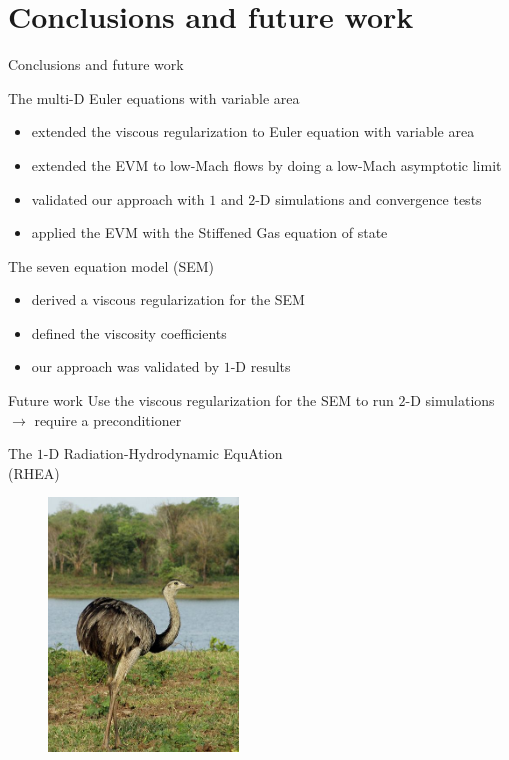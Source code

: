\documentclass[xcolor=dvipsnames,10pt]{beamer}
\begin{document}
\section{Conclusions and future work}
\begin{frame}{Conclusions and future work}
\begin{block}{The multi-D Euler equations with variable area}
\begin{itemize}
\item extended the viscous regularization to Euler equation with variable area
\item extended the EVM to low-Mach flows by doing a low-Mach asymptotic limit
\item validated our approach with $1$ and $2$-D simulations and convergence tests
\item applied the EVM with the Stiffened Gas equation of state
\end{itemize}
\end{block}
\begin{block}{The seven equation model (SEM)}
\begin{itemize}
\item derived a viscous regularization for the SEM
\item defined the viscosity coefficients
\item our approach was validated by $1$-D results
\end{itemize}
\end{block}
\begin{block}{Future work}
Use the viscous regularization for the SEM to run $2$-D simulations $\to$ require a preconditioner
\end{block}
\end{frame}
\begin{frame}{}
\begin{center}
The $1$-D Radiation-Hydrodynamic EquAtion \\
(RHEA)
\end{center}
\begin{figure}[H]
\centering
\includegraphics[width=0.45\textwidth]{../figures/rhea.png}
\end{figure}
\end{frame}
\end{document}

